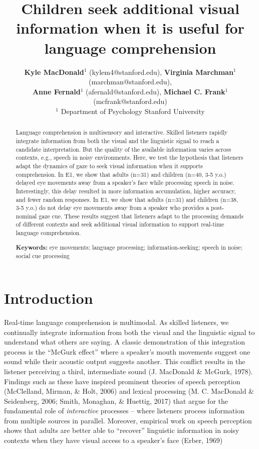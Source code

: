 \documentclass[10pt, letterpaper]{article}
\title{Children seek additional visual information when it is useful for
language comprehension}
\author{ {\large \bf Kyle MacDonald}$^1$ (kylem4@stanford.edu), {\large \bf Virginia Marchman}$^1$ (marchman@stanford.edu),  \\ {\large \bf Anne Fernald}$^1$ (afernald@stanford.edu), {\large \bf Michael C. Frank}$^1$ (mcfrank@stanford.edu) 
  \\ $^1$ Department of Psychology Stanford University}
\begin{document}
\maketitle

\begin{abstract}
Language comprehension is multisensory and interactive. Skilled
listeners rapidly integrate information from both the visual and the
linguistic signal to reach a candidate interpretation. But the quality
of the available information varies across contexts, e.g., speech in
noisy environments. Here, we test the hypothesis that listeners adapt
the dynamics of gaze to seek visual information when it supports
comprehension. In E1, we show that adults (n=31) and children (n=40, 3-5
y.o.) delayed eye movements away from a speaker's face while processing
speech in noise. Interestingly, this delay resulted in more information
accumulation, higher accuracy, and fewer random responses. In E1, we
show that adults (n=31) and children (n=38, 3-5 y.o.) do not delay eye
movements away from a speaker who provides a post-nominal gaze cue.
These results suggest that listeners adapt to the processing demands of
different contexts and seek additional visual information to support
real-time language comprehension.

\textbf{Keywords:}
eye movements; language processing; information-seeking; speech in
noise; social cue processing
\end{abstract}

\section{Introduction}\label{introduction}

Real-time language comprehension is multimodal. As skilled listeners, we
continually integrate information from both the visual and the
linguistic signal to understand what others are saying. A classic
demonstration of this integration process is the ``McGurk effect'' where
a speaker's mouth movements suggest one sound while their acoustic
output suggests another. This conflict results in the listener
perceiving a third, intermediate sound (J. MacDonald \& McGurk, 1978).
Findings such as these have inspired prominent theories of speech
perception (McClelland, Mirman, \& Holt, 2006) and lexical processing
(M. C. MacDonald \& Seidenberg, 2006; Smith, Monaghan, \& Huettig, 2017)
that argue for the fundamental role of \emph{interactive} processes --
where listeners process information from multiple sources in parallel.
Moreover, empirical work on speech perception shows that adults are
better able to ``recover'' linguistic information in noisy contexts when
they have visual access to a speaker's face (Erber, 1969)
\end{document}
